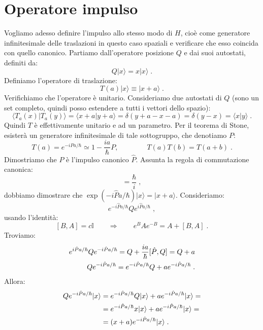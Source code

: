 \documentclass[10pt,a4paper]{report}
\theoremstyle{definition}
\numberwithin{equation}{section}
\newcommand{\bra}{\langle}
\newcommand{\ket}{\rangle}
\begin{document}
\section{Operatore impulso}
Vogliamo adesso definire l'impulso allo stesso modo di $H$, cioè come generatore infinitesimale delle traslazioni in questo caso spaziali e verificare che esso coincida con quello canonico. Partiamo dall'operatore posizione $Q$ e dai suoi autostati, definiti da:
\begin{equation}
Q|x\ket=x|x\ket\;.
\end{equation}
Definiamo l'operatore di traslazione:
\begin{equation}
T(a)|x\ket\equiv|x+a\ket\;.
\end{equation}
Verifichiamo che l'operatore è unitario. Consideriamo due autostati di $Q$ (sono un set completo, quindi posso estendere a tutti i vettori dello spazio):
\begin{equation}
\bra T_a(x)|T_a(y)\ket=\bra x+a|y+a\ket=\delta(y+a-x-a)=\delta(y-x)=\bra x|y\ket\;.
\end{equation}
Quindi $T$ è effettivamente unitario e ad un parametro. Per il teorema di Stone, esisterà un generatore infinitesimale di tale sottogruppo, che denotiamo $P$:
\begin{equation}
T(a)=e^{-iPa/\hbar}\simeq 1-\frac{ia}{\hbar}P, \qquad\qquad T(a)T(b)=T(a+b)\;.
\end{equation}
Dimostriamo che $P$ è l'impulso canonico $\hat{P}$. Assunta la regola di commutazione canonica:
\begin{equation}
[\hat{P},\hat{Q}]=\frac{\hbar}{i}\;,
\end{equation}
dobbiamo dimostrare che $\exp(-i\hat{P}a/\hbar)|x\ket=|x+a\ket$. Consideriamo:
\begin{equation}
e^{-i\hat{P}a/\hbar}Qe^{i\hat{P}a/\hbar}\;,
\end{equation}
usando l'identità:
$$
[B,A]=c\mathbb{I} \qquad \Longrightarrow\qquad e^BAe^{-B}=A+[B,A]\;.
$$	
Troviamo:
\begin{align}
e^{i\hat{P}a/\hbar}Qe^{-i\hat{P}a/\hbar}=Q+\frac{ia}{\hbar}[\hat{P},Q]=Q+a \notag \\
Qe^{-i\hat{P}a/\hbar}=e^{-i\hat{P}a/\hbar}Q+ae^{-i\hat{P}a/\hbar}\;.
\end{align}
Allora:
\begin{align}
Qe^{-i\hat{P}a/\hbar}|x\ket &= e^{-i\hat{P}a/\hbar}Q|x\ket+ae^{-i\hat{P}a/\hbar}|x\ket = \notag \\
&= e^{-i\hat{P}a/\hbar}x|x\ket+ae^{-i\hat{P}a/\hbar}|x\ket= \notag \\
&= (x+a)e^{-i\hat{P}a/\hbar}|x\ket\;.
\end{align}
\end{document}
